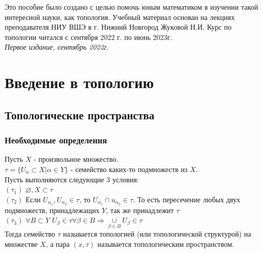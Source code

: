 \documentclass[11pt,fleqn]{book} %
\begin{document}
\noindent Это пособие было создано с целью помочь юным математиком в изучении такой интересной науки, как топология. Учебный материал основан на лекциях преподавателя НИУ ВШЭ в г. Нижний Новгород Жуковой Н.И. Курс по топологии читался с сентября 2022 г. по июнь 2023г. \\ 

\noindent \textit{Первое издание, сентябрь 2022г. }


\chapterimage{} %

\pagestyle{empty} %

\tableofcontents %

\cleardoublepage %

\pagestyle{fancy} %


\chapterimage{} %
\chapter{Введение в топологию}
\section{Топологические пространства}
\subsection{Необходимые определения}
\begin{definition}[Топология]
Пусть $X$ - произвольное множество.\\ $\tau =\{U_{\alpha}{\subset}X|\alpha{\in}Y\}$ - семейство каких-то подмножеств из $X$.\\ Пусть выполняются следующие 3 условия:\\ $(\tau_1)$ $\varnothing, X{\subset}\tau$\\
$(\tau_2)$ Если $U_{\alpha_1}, U_{\alpha_2}{\in}\tau$, то $U_{\alpha_1}{\cap}u_{\alpha_2}{\in}\tau$. То есть пересечение любых двух подмножеств, принадлежащих $Y$, так же принадлежит $\tau$\\
$(\tau_3)$ $\forall B{\subset}Y$ $U_{\beta}{\in}\tau \forall \beta{\in}B \Rightarrow \underset{\beta{\in}B}{\cup}U_{\beta}{\in}\tau$\\
Тогда семейство $\tau$ называется топологией (или топологической структурой) на множестве $X$, а пара $(x,\tau)$ называется топологическим пространством.
\end{definition}
\end{document}
